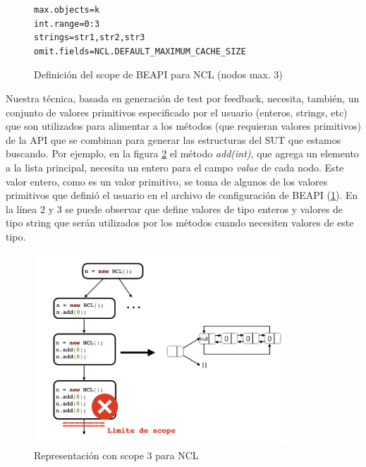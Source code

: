 \begin{figure}[H]
\begin{lstlisting}[keywordstyle=\scriptsize\ttfamily]
max.objects=k
int.range=0:3
strings=str1,str2,str3
omit.fields=NCL.DEFAULT_MAXIMUM_CACHE_SIZE
\end{lstlisting}
\caption{Definición del scope de BEAPI para NCL (nodos max. 3)}
\label{fig:NCL-fin-BEAPI}
\end{figure}


Nuestra técnica, basada en generación de test por feedback, necesita, también, un conjunto de valores primitivos especificado por el usuario 
(enteros, strings, etc) que son utilizados para alimentar a los métodos (que requieran valores primitivos) de la API que se combinan para generar 
las estructuras del SUT que estamos buscando.
Por ejemplo, en la figura \ref{fig:scope} el método \emph{add(int)}, que agrega un elemento a la lista principal, 
necesita un entero para el campo \emph{value} de cada nodo. Este valor entero, como es un valor primitivo, 
se toma de algunos de los valores primitivos que definió el usuario en el archivo de configuración de BEAPI (\ref{fig:NCL-fin-BEAPI}). 
En la línea 2 y 3 se puede observar que define valores de tipo enteros y valores de tipo string que serán utilizados por los métodos 
cuando necesiten valores de este tipo. 
\\


\begin{figure}[H]
    \centering
    \includegraphics[width=0.85\textwidth]{images/scope.jpg}
    \caption{Representación con scope 3 para NCL}
    \label{fig:scope}
\end{figure}


